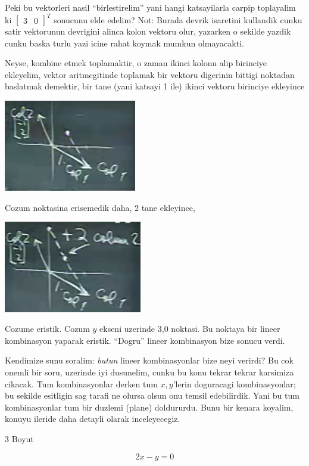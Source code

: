 \documentclass[12pt,fleqn]{article}\usepackage{../common}
\begin{document}
Peki bu vektorleri nasil ``birlestirelim'' yani hangi katsayilarla carpip
toplayalim ki $\left[\begin{array}{rr}3 & 0\end{array}\right]^T$ sonucunu
elde edelim? Not: Burada devrik isaretini kullandik cunku satir vektorunun
devrigini alinca kolon vektoru olur, yazarken o sekilde yazdik cunku baska
turlu yazi icine rahat koymak mumkun olmayacakti.

Neyse, kombine etmek toplamaktir, o zaman ikinci kolonu alip birinciye
ekleyelim, vektor aritmegitinde toplamak bir vektoru digerinin bittigi
noktadan baslatmak demektir, bir tane (yani katsayi 1 ile) ikinci vektoru
birinciye ekleyince

\includegraphics[height=4cm]{1_04.png}

Cozum noktasina erisemedik daha, 2 tane ekleyince,

\includegraphics[height=4cm]{1_05.png}

Cozume eristik. Cozum $y$ ekseni uzerinde 3,0 noktasi. Bu noktaya bir
lineer kombinasyon yaparak eristik. ``Dogru'' lineer kombinasyon bize
sonucu verdi. 

Kendimize sunu soralim: {\em butun} lineer kombinasyonlar bize neyi
verirdi? Bu cok onemli bir soru, uzerinde iyi dusunelim, cunku bu konu
tekrar tekrar karsimiza cikacak. Tum kombinasyonlar derken tum $x,y$'lerin
doguracagi kombinasyonlar; bu sekilde esitligin sag tarafi ne olursa olsun
onu temsil edebilirdik. Yani bu tum kombinasyonlar tum bir duzlemi (plane)
doldururdu. Bunu bir kenara koyalim, konuyu ileride daha detayli olarak
inceleyecegiz.

3 Boyut

$$  2x - y = 0  $$
\end{document}
